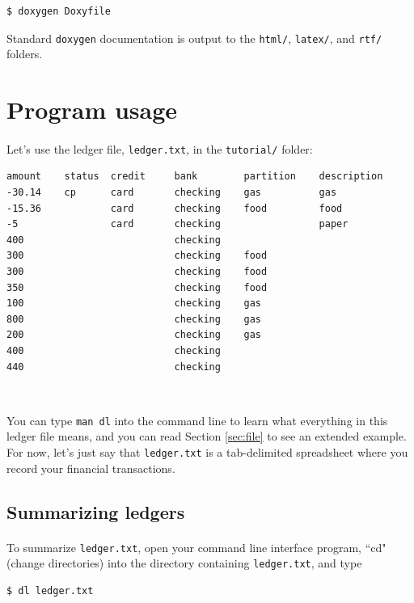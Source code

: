 \documentclass{article}
\providecommand{\q}{$\quad$ \newline}
\begin{document}
\begin{flushleft}
\begin{lstlisting}
$ doxygen Doxyfile
\end{lstlisting}

Standard {\tt doxygen} documentation is output to the {\tt html/}, {\tt latex/}, and {\tt rtf/} folders.


\section{Program usage}

\paragraph{} Let's use the ledger file, {\tt ledger.txt}, in the {\tt tutorial/} folder:

\begin{lstlisting}[title=ledger.txt]
amount    status  credit     bank        partition    description
-30.14    cp      card       checking    gas          gas
-15.36            card       checking    food         food
-5                card       checking                 paper
400                          checking
300                          checking    food
300                          checking    food
350                          checking    food
100                          checking    gas
800                          checking    gas
200                          checking    gas
400                          checking
440                          checking
\end{lstlisting} \q
 
You can type {\tt man dl} into the command line to learn what everything in this ledger file means, and you can read Section \ref{sec:file} to see an extended example. For now, let's just say that {\tt ledger.txt} is a tab-delimited spreadsheet where you record your financial transactions.

\subsection{Summarizing ledgers}

\paragraph{} To summarize {\tt ledger.txt}, open your command line interface program, ``cd" (change directories) into the directory containing {\tt ledger.txt}, and type

\begin{lstlisting}
$ dl ledger.txt
\end{lstlisting} 


\end{flushleft}
\end{document}
